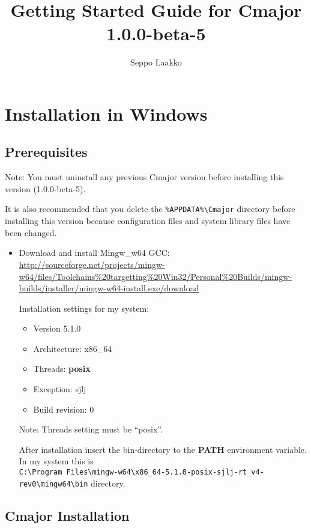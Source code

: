 \documentclass[oneside, a4paper, 11pt]{article}
\begin{document}
\title{Getting Started Guide for Cmajor 1.0.0-beta-5}
\author{Seppo Laakko}
\maketitle

\section{Installation in Windows}

\subsection{Prerequisites}

Note:
You must uninstall any previous Cmajor version before installing
this version (1.0.0-beta-5).

It is also recommended that you delete the
\verb|%APPDATA%\Cmajor| directory before installing
this version because configuration files and system library files
have been changed.

\begin{itemize}

\item
Download and install Mingw\_w64 GCC:\\
\url{http://sourceforge.net/projects/mingw-w64/files/Toolchains%20targetting%20Win32/Personal%20Builds/mingw-builds/installer/mingw-w64-install.exe/download}

Installation settings for my system:
\begin{itemize}
\item
Version 5.1.0
\item
Architecture: x86\_64
\item
Threads: \textbf{posix}
\item
Exception: sjlj
\item
Build revision: 0
\end{itemize}

Note: Threads setting must be ``posix''.

After installation insert the bin-directory to the \textbf{PATH} environment variable.
In my system this is\\
\verb|C:\Program Files\mingw-w64\x86_64-5.1.0-posix-sjlj-rt_v4-rev0\mingw64\bin| directory.

\end{itemize}

\subsection{Cmajor Installation}
\end{document}
